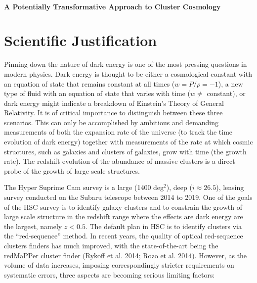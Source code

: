 \documentclass[letterpaper,12pt]{article}
\begin{document}
\\[-1cm]
\begin{center}
\bf\Large
A Potentially Transformative Approach to Cluster Cosmology 
\end{center}

\section{Scientific Justification} 

Pinning down the nature of dark energy is one of the most pressing questions in modern physics. Dark energy is thought
to be either a cosmological constant with an equation of state that remains constant at all times ($w=P/\rho=-1$), a
new type of fluid with an equation of state that varies with time ($w \neq$ constant), or dark energy might indicate a
breakdown of Einstein's Theory of General Relativity. It is of critical importance to distinguish between these three
scenarios. This can only be accomplished by ambitious and demanding measurements of both the expansion rate of the
universe (to track the time evolution of dark energy) together with measurements of the rate at which cosmic
structures, such as galaxies and clusters of galaxies, grow with time (the growth rate). The redshift evolution of
the abundance of massive clusters is a direct probe of the growth of large scale structures.

The Hyper Suprime Cam survey is a large (1400 deg$^2$), deep ($i\approx26.5$), lensing survey conducted on the Subaru
telescope between 2014 to 2019. One of the goals of the HSC survey is to identify galaxy clusters and to constrain
the growth of large scale structure in the redshift range where the effects are dark energy are the largest, namely
$z<0.5$. The default plan in HSC is to identify clusters via the  ``red-sequence'' method. In recent years, the quality of
optical red-sequence clusters finders has much improved, with the state-of-the-art being the redMaPPer cluster finder
(Rykoff et al. 2014; Rozo et al. 2014). However, as the volume of data increases, imposing correspondingly stricter
requirements on systematic errors, three aspects are becoming serious limiting factors:
\end{document}
